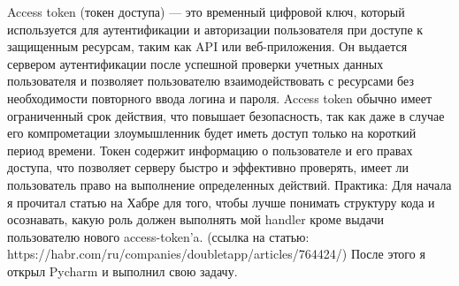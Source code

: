 \documentclass[a4paper,12pt]{article}
\begin{document}
Access token (токен доступа) — это временный цифровой ключ, который используется для аутентификации и авторизации пользователя при доступе к защищенным ресурсам, таким как API или веб-приложения. Он выдается сервером аутентификации после успешной проверки учетных данных пользователя и позволяет пользователю взаимодействовать с ресурсами без необходимости повторного ввода логина и пароля. Access token обычно имеет ограниченный срок действия, что повышает безопасность, так как даже в случае его компрометации злоумышленник будет иметь доступ только на короткий период времени. Токен содержит информацию о пользователе и его правах доступа, что позволяет серверу быстро и эффективно проверять, имеет ли пользователь право на выполнение определенных действий.
Практика:
Для начала я прочитал статью на Хабре для того, чтобы лучше понимать структуру кода и осознавать, какую роль должен выполнять мой handler кроме выдачи пользователю нового access-token’a. (ссылка на статью: https://habr.com/ru/companies/doubletapp/articles/764424/)
После этого я открыл Pycharm и выполнил свою задачу.
\end{document}
